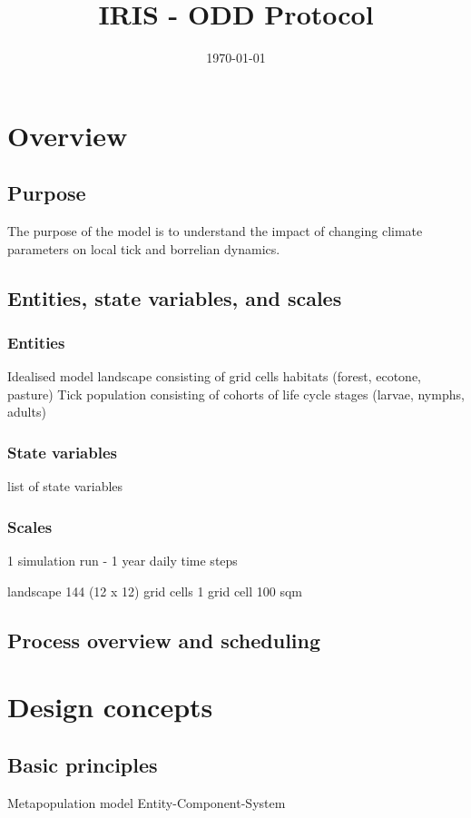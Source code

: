 \documentclass[a4paper, 11pt]{article}
\title{IRIS - ODD Protocol}
\author{}
\date{\today}
\begin{document}
	
\maketitle
\tableofcontents

\section{Overview}

\subsection{Purpose}
The purpose of the model is to understand the impact of changing climate parameters on local tick and borrelian dynamics. 


\subsection{Entities, state variables, and scales}

\subsubsection{Entities}
Idealised model landscape consisting of grid cells 
habitats (forest, ecotone, pasture)
Tick population consisting of cohorts of life cycle stages (larvae, nymphs, adults)


\subsubsection{State variables}

list of state variables


\subsubsection{Scales}
1 simulation run - 1 year 
daily time steps

landscape 144 (12 x 12) grid cells
1 grid cell 100 sqm 


\subsection{Process overview and scheduling}

\section{Design concepts}

\subsection{Basic principles}
Metapopulation model
Entity-Component-System
\end{document}
